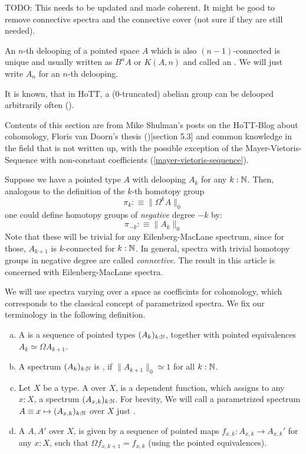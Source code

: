 
TODO: This needs to be updated and made coherent. It might be good to remove connective spectra and the connective cover (not sure if they are still needed).

An $n$-th delooping of a pointed space $A$ which is also $(n-1)$-connected is unique and usually written as $B^nA$ or $K(A,n)$ and called an .
We will just write $A_n$ for an $n$-th delooping.

It is known, that in HoTT, a (0-truncated) abelian group can be delooped arbitrarily often (\cite{LicataFinster}).

Contents of this section are from Mike Shulman's posts on the HoTT-Blog about cohomology,
Floris van Doorn's thesis (\cite{floris-thesis})[section 5.3]
and common knowledge in the field that is not written up,
with the possible exception of the Mayer-Vietoris-Sequence with non-constant coefficients (\cref{mayer-vietoris-sequence}).

Suppose we have a pointed type $A$ with delooping $A_k$ for any $k:\mathbb{N}$.
Then, analogous to the definition of the $k$-th homotopy group
\[ \pi_k:\equiv\|\Omega^kA \|_0 \]
one could define homotopy groups of \emph{negative} degree $-k$ by:
\[ \pi_{-k}:\equiv\|A_k \|_0 \]
Note that these will be trivial for any Eilenberg-MacLane spectrum, since for those, $A_{k+1}$ is $k$-connected for $k:\mathbb{N}$.
In general, spectra with trivial homotopy groups in negative degree are called \emph{connective}.
The result in this article is concerned with Eilenberg-MacLane spectra.

We will use spectra varying over a space as coefficints for cohomology,
which corresponds to the classical concept of parametrized spectra.
We fix our terminology in the following definition.

\begin{definition}
  \begin{enumerate}[(a)]
  \item A  is a sequence of pointed types $(A_k)_{k:\mathbb{N}}$, together with pointed equivalences $A_k\simeq \Omega A_{k+1}$.
  \item A spectrum $(A_k)_{k:\mathbb{N}}$ is , if $\|A_{k+1}\|_0\simeq 1$ for all $k:\mathbb{N}$.
  \item Let $X$ be a type. A  over $X$, is a dependent function, which assigns to any $x:X$, a spectrum $(A_{x,k})_{k:\mathbb{N}}$.
    For brevity, We will call a parametrized spectrum $A\equiv x\mapsto (A_{x,k})_{k:\mathbb{N}}$ over $X$ just .
  \item A  $A,A'$ over $X$, is given by a sequence of pointed maps $f_{x,k}:A_{x,k}\to A_{x,k}'$ for any $x:X$,
    such that $\Omega f_{x,k+1}=f_{x,k}$ (using the pointed equivalences).
  \end{enumerate}
\end{definition}

